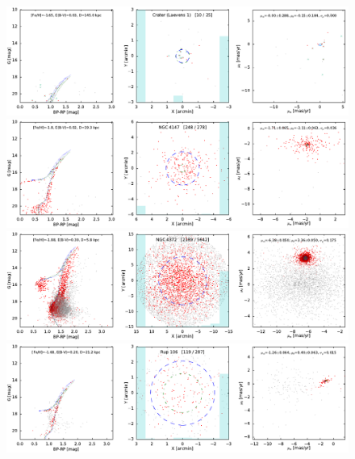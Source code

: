 \documentclass[usenatbib]{mnras}
\begin{document}
\clearpage\begin{figure}
\contcaption{}
\includegraphics{figs/Crater.pdf}
\includegraphics{figs/NGC_4147.pdf}
\includegraphics{figs/NGC_4372.pdf}
\includegraphics{figs/Rup_106.pdf}
\end{figure}
\end{document}
